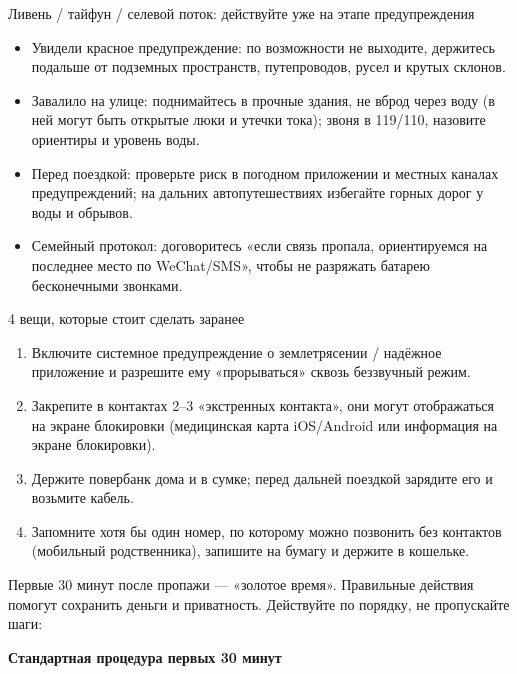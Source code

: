 \begin{tcbwarn}{Ливень / тайфун / селевой поток: действуйте уже на этапе предупреждения}
\begin{itemize}
  \item Увидели красное предупреждение: по возможности не выходите, держитесь подальше от подземных пространств, путепроводов, русел и крутых склонов.
  \item Завалило на улице: поднимайтесь в прочные здания, не вброд через воду (в ней могут быть открытые люки и утечки тока); звоня в 119/110, назовите ориентиры и уровень воды.
  \item Перед поездкой: проверьте риск в погодном приложении и местных каналах предупреждений; на дальних автопутешествиях избегайте горных дорог у воды и обрывов.
  \item Семейный протокол: договоритесь «если связь пропала, ориентируемся на последнее место по WeChat/SMS», чтобы не разряжать батарею бесконечными звонками.
\end{itemize}

\end{tcbwarn}

\begin{tcbpractice}{4 вещи, которые стоит сделать заранее}
\begin{enumerate}
  \item Включите системное предупреждение о землетрясении / надёжное приложение и разрешите ему «прорываться» сквозь беззвучный режим.
  \item Закрепите в контактах 2–3 «экстренных контакта», они могут отображаться на экране блокировки (медицинская карта iOS/Android или информация на экране блокировки).
  \item Держите повербанк дома и в сумке; перед дальней поездкой зарядите его и возьмите кабель.
  \item Запомните хотя бы один номер, по которому можно позвонить без контактов (мобильный родственника), запишите на бумагу и держите в кошельке.
\end{enumerate}

\end{tcbpractice}


Первые 30 минут после пропажи — «золотое время». Правильные действия помогут сохранить деньги и приватность. Действуйте по порядку, не пропускайте шаги:

\textbf{Стандартная процедура первых 30 минут}\par

